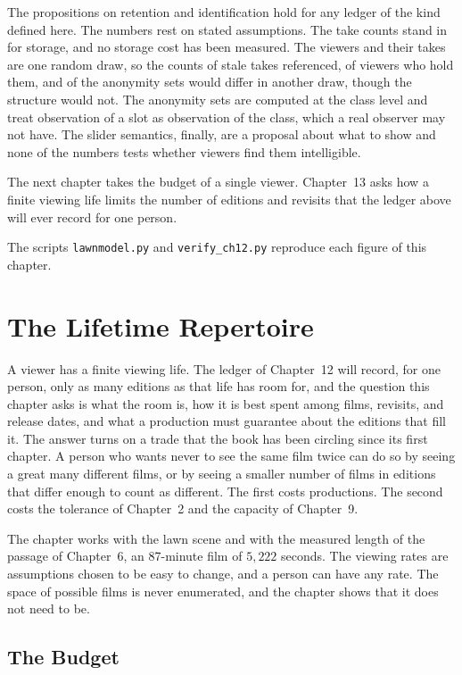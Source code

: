 \documentclass[11pt,twoside,openright]{book}
\theoremstyle{plain}
\theoremstyle{definition}
\theoremstyle{remark}
\begin{document}
The propositions on retention and identification hold for any ledger of the kind defined here. The numbers rest on stated assumptions. The take counts stand in for storage, and no storage cost has been measured. The viewers and their takes are one random draw, so the counts of stale takes referenced, of viewers who hold them, and of the anonymity sets would differ in another draw, though the structure would not. The anonymity sets are computed at the class level and treat observation of a slot as observation of the class, which a real observer may not have. The slider semantics, finally, are a proposal about what to show and none of the numbers tests whether viewers find them intelligible.

The next chapter takes the budget of a single viewer. Chapter~13 asks how a finite viewing life limits the number of editions and revisits that the ledger above will ever record for one person.

The scripts \texttt{lawnmodel.py} and \texttt{verify\_ch12.py} reproduce each figure of this chapter.

\chapter{The Lifetime Repertoire}
\label{ch:repertoire}

A viewer has a finite viewing life. The ledger of Chapter~12 will record, for one person, only as many editions as that life has room for, and the question this chapter asks is what the room is, how it is best spent among films, revisits, and release dates, and what a production must guarantee about the editions that fill it. The answer turns on a trade that the book has been circling since its first chapter. A person who wants never to see the same film twice can do so by seeing a great many different films, or by seeing a smaller number of films in editions that differ enough to count as different. The first costs productions. The second costs the tolerance of Chapter~2 and the capacity of Chapter~9.

The chapter works with the lawn scene and with the measured length of the passage of Chapter~6, an 87-minute film of $5{,}222$ seconds. The viewing rates are assumptions chosen to be easy to change, and a person can have any rate. The space of possible films is never enumerated, and the chapter shows that it does not need to be.

\section{The Budget}\label{sec:budget13}
\end{document}
